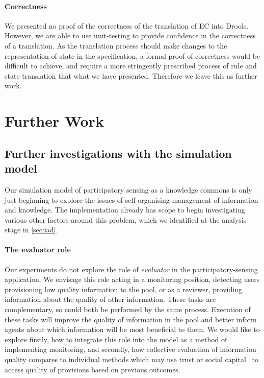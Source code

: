 \paragraph{Correctness} We presented no proof of the correctness of the
translation of \ac{EC} into Drools. However, we are able to use unit-testing
to provide confidence in the correctness of a translation. As the translation
process should make changes to the representation of state in the
specification, a formal proof of correctness would be difficult to achieve,
and require a more stringently prescribed process of rule and state
translation that what we have presented. Therefore we leave this as further
work.

\section{Further Work}


\subsection{Further investigations with the simulation model}

Our simulation model of participatory sensing as a knowledge commons is only
just beginning to explore the issues of self-organising management of
information and knowledge. The implementation already has scope to begin
investigating various other factors around this problem, which we identified at
the analysis stage in \autoref{sec:iad}.


\paragraph{The evaluator role} Our experiments do not explore the role of
\emph{evaluator} in the participatory-sensing application. We envisage this
role acting in a monitoring position, detecting users provisioning low
quality information to the pool, or as a reviewer, providing information about
the quality of other information. These tasks are complementary, so could both
be performed by the same process. Execution of these tasks will improve the
quality of information in the pool and better inform agents about which
information will be most beneficial to them. We would like to explore
firstly, how to integrate this role into the model as a method of implementing
monitoring, and secondly, how collective evaluation of information quality
compares to individual methods which may use trust or social
capital~\citep{Petruzzi2014} to access quality of provisions based on previous
outcomes.

